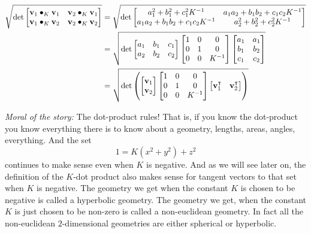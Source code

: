 \documentclass[newpage,hints,handout]{ximera}
\begin{document}
\begin{problem}
\begin{freeResponse}
\begin{align*}
\sqrt{\det
\begin{bmatrix}
\mathbf{v}_{1}\bullet_{K}\mathbf{v}_{1} & \mathbf{v}_{2}\bullet_{K}\mathbf{v}_{1}\\
\mathbf{v}_{1}\bullet_{K}\mathbf{v}_{2} & \mathbf{v}_{2}\bullet_{K}\mathbf{v}_{2}%
\end{bmatrix}}
&=\sqrt{\det
\begin{bmatrix}
a^2_1 + b^2_1 + c^2_1K^{-1} & a_1a_2 + b_1b_2 + c_1c_2K^{-1}\\
a_1a_2 + b_1b_2 + c_1c_2K^{-1} & a^2_2 + b^2_2 + c^2_2K^{-1}%
\end{bmatrix}} \\
&= \sqrt{\det
\begin{bmatrix}
a_{1} & b_{1} & c_{1}\\
a_{2} & b_{2} & c_{2}
\end{bmatrix}
\begin{bmatrix}
1 & 0 & 0\\
0 & 1 & 0\\
0 & 0 & K^{-1}
\end{bmatrix}
\begin{bmatrix}
a_{1} & a_{1}  \\
b_{1} & b_{2}  \\
c_{1} &  c_{2}
\end{bmatrix}} \\
&= \sqrt{\det\left( 
\begin{bmatrix}
\mathbf{v}_{1} \\
\mathbf{v}_{2}
\end{bmatrix}
\begin{bmatrix}
1 & 0 & 0\\
0 & 1 & 0\\
0 & 0 & K^{-1}%
\end{bmatrix}
\begin{bmatrix}
\mathbf{v}_{1}^\transpose & \mathbf{v}_{2}^\transpose%
\end{bmatrix}
\right) }
\end{align*}
\end{freeResponse}

\end{problem}

\textit{Moral of the story:} The dot-product rules! That is, if you
know the dot-product you know everything there is to know about a
geometry, lengths, areas, angles, everything. And the set
\[
1=K\left(x^{2}+y^{2}\right)+z^{2} 
\]
continues to make sense even when $K$ is
negative. And as we will see later on, the definition of the $K$-dot
product also makes sense for tangent vectors to that set when $K$ is
negative. The geometry we get when the constant $K$ is chosen to be
negative is called a hyperbolic geometry. The geometry we get, when
the constant $K$ is just chosen to be non-zero is called a
non-euclidean geometry.  In fact all the non-euclidean $2$-dimensional
geometries are either spherical or hyperbolic.
\end{document}
